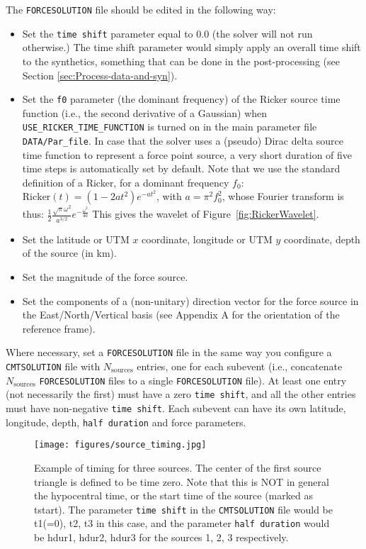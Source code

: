 \noindent The \texttt{FORCESOLUTION} file should be edited in the
following way:
\begin{itemize}
\item Set the \texttt{time shift} parameter equal to $0.0$ (the solver
will not run otherwise.) The time shift parameter would simply apply
an overall time shift to the synthetics, something that can be done
in the post-processing (see Section \ref{sec:Process-data-and-syn}).
\item Set the \texttt{f0} parameter (the dominant frequency) of the Ricker source time
function (i.e., the second derivative of a Gaussian) when {\texttt{USE\_RICKER\_TIME\_FUNCTION}} is turned on
in the main parameter file \texttt{DATA/Par\_file}. In case that the
solver uses a (pseudo) Dirac delta source time function to represent
a force point source, a very short duration of five time steps is automatically set by default.
Note that we use the standard definition of a Ricker, for a dominant frequency $f_0$:
$\mathrm{Ricker}(t) = (1 - 2 a t^2) e^{-a t^2}$, with $a = \pi^2 f_0^2$,
whose Fourier transform is thus:
$\frac{1}{2} \frac{\sqrt{\pi}\omega^2}{a^{3/2}}e^{-\frac{\omega^2}{4 a}}$
This gives the wavelet of Figure~\ref{fig:RickerWavelet}.
\item Set the latitude or UTM $x$ coordinate, longitude or UTM $y$ coordinate, depth of the source (in km).
\item Set the magnitude of the force source.
\item Set the components of a (non-unitary) direction vector for the force
source in the East/North/Vertical basis (see Appendix A for the orientation
of the reference frame).
\end{itemize}
\noindent Where necessary, set a \texttt{FORCESOLUTION} file in the
same way you configure a \texttt{CMTSOLUTION} file with $N_{\mathrm{sources}}$
entries, one for each subevent (i.e., concatenate $N_{\mathrm{sources}}$
\texttt{FORCESOLUTION} files to a single \texttt{FORCESOLUTION} file).
At least one entry (not necessarily the first) must have a zero \texttt{time
shift}, and all the other entries must have non-negative \texttt{time
shift}. Each subevent can have its own latitude, longitude, depth,
\texttt{half duration} and force parameters.

\begin{figure}[H]
\begin{centering}
\texttt{[image: figures/source\_timing.jpg]}
\par
\end{centering}
\caption{Example of timing for three sources. The center of the first source
triangle is defined to be time zero. Note that this is NOT in general
the hypocentral time, or the start time of the source (marked as tstart).
The parameter \texttt{time shift} in the \texttt{CMTSOLUTION} file
would be t1(=0), t2, t3 in this case, and the parameter \texttt{half
duration} would be hdur1, hdur2, hdur3 for the sources 1, 2, 3 respectively.}
{\small \label{fig:source_timing} }
\end{figure}

